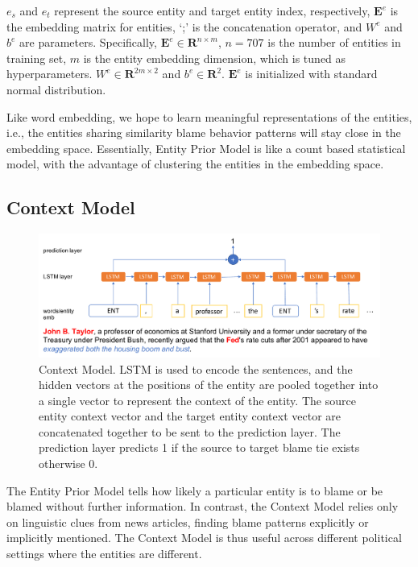 \documentclass[letterpaper]{article} %
\begin{document}
$e_s$ and $e_t$ represent the source entity and target entity index, respectively, $\mathbf{E}^e$ is the embedding matrix for entities, `;' is the concatenation operator, and $W^e$ and $b^e$ are parameters. Specifically, $\mathbf{E}^e \in \mathbf{R}^{n\times m}$, $n=707$ is the number of entities in training set, $m$ is the entity embedding dimension, which is tuned as hyperparameters. $W^e \in \mathbf{R}^{2m\times 2}$ and $b^e \in \mathbf{R}^{2} $. $\mathbf{E}^e$ is initialized with standard normal distribution.

Like word embedding, we hope to learn meaningful representations of the entities, i.e., the entities sharing similarity blame behavior patterns will stay close in the embedding space. Essentially, Entity Prior Model is like a count based statistical model, with the advantage of clustering the entities in the embedding space.

\subsection{Context Model}
\label{contextmodel}

\begin{figure}[!tp] 
  \centering 
  \includegraphics[width=5.5in]{contextmodel.pdf}
  \caption{Context Model. LSTM is used to encode the sentences, and the hidden vectors at the positions of the entity are pooled together into a single vector to represent the context of the entity. The source entity context vector and the target entity context vector are concatenated together to be sent to the prediction layer. The prediction layer predicts 1 if the source to target blame tie exists otherwise 0.}
  \label{figure:contextmodel}
\end{figure}

The Entity Prior Model tells how likely a particular entity is to blame or be blamed without further information. In contrast, the Context Model relies only on linguistic clues from news articles, finding blame patterns explicitly or implicitly mentioned. The Context Model is thus useful across different political settings where the entities are different.
\end{document}
